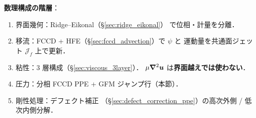 \noindent\textbf{数理構成の階層}：
\begin{enumerate}[leftmargin=2em,noitemsep]
  \item 界面幾何：Ridge--Eikonal（\S\ref{sec:ridge_eikonal}）
        で位相・計量を分離．
  \item 移流：FCCD + HFE（\S\ref{sec:fccd_advection}）で $\psi$ と
        運動量を共通面ジェット $\mathcal{J}_f$ 上で更新．
  \item 粘性：3 層構成（\S\ref{sec:viscous_3layer}）．
        $\mu\bm{\nabla}^2\bm{u}$ は\textbf{界面越えでは使わない}．
  \item 圧力：分相 FCCD PPE + GFM ジャンプ行（本節）．
  \item 剛性処理：デフェクト補正
        （\S\ref{sec:defect_correction_ppe}）の高次外側 / 低次内側分解．
\end{enumerate}

